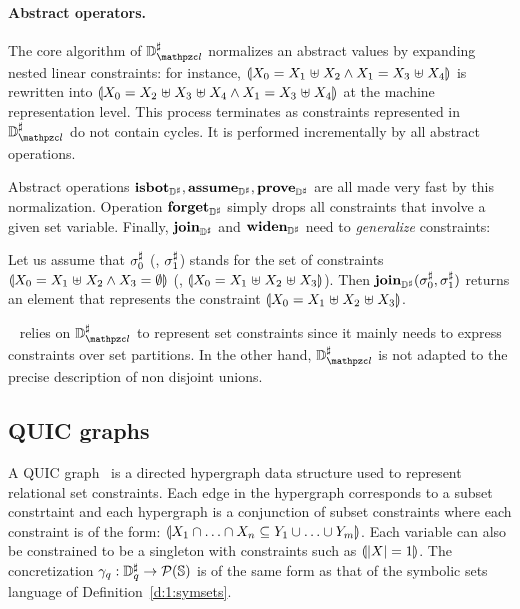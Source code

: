 \paragraph{Abstract operators.}
The core algorithm of \( \adomlin \) normalizes an abstract values by
expanding nested linear constraints:
for instance, \( \llparenthesis X_0 = X_1 \mathrel{\uplus} X_2 \wedge
  X_1 = X_3 \mathrel{\uplus} X_4 \rrparenthesis \) is rewritten into
\( \llparenthesis X_0 = X_2 \mathrel{\uplus} X_3 \mathrel{\uplus} X_4 \wedge
  X_1 = X_3 \mathrel{\uplus} X_4 \rrparenthesis \) at the machine representation
level.
This process terminates as constraints represented in \( \adomlin \)
do not contain cycles.
It is performed incrementally by all abstract operations.

Abstract operations \( \textbf{isbot}_{{\mathbb{D}}^{\sharp}}, \textbf{assume}_{{\mathbb{D}}^{\sharp}}, \textbf{prove}_{{\mathbb{D}}^{\sharp}} \) are all
made very fast by this normalization.
Operation \( \textbf{forget}_{{\mathbb{D}}^{\sharp}} \) simply drops all constraints that involve
a given set variable.
Finally, \( \textbf{join}_{{\mathbb{D}}^{\sharp}} \) and \( \textbf{widen}_{{\mathbb{D}}^{\sharp}} \) need to {\em generalize}
constraints:
\begin{example}
  Let us assume that \( {\sigma}^{\sharp}_0 \) (\resp, \( {\sigma}^{\sharp}_1 \)) stands for
  the set of constraints \( \llparenthesis X_0 = X_1 \mathrel{\uplus} X_2
    \wedge X_3 = \emptyset \rrparenthesis \) (\resp, \( \llparenthesis X_0 = X_1
    \mathrel{\uplus} X_2 \mathrel{\uplus} X_3 \rrparenthesis \)).
  Then \( \textbf{join}_{{\mathbb{D}}^{\sharp}}( {\sigma}^{\sharp}_0, {\sigma}^{\sharp}_1 ) \) returns an element that
  represents the constraint \( \llparenthesis X_0 = X_1 \mathrel{\uplus} X_2
    \mathrel{\uplus} X_3 \rrparenthesis \).
\end{example}
\memcad~\cite{memcad:15:sas} relies on \( \adomlin \) to represent set
constraints since it mainly needs to express constraints over set
partitions.
In the other hand, \( \adomlin \) is not adapted to the precise
description of non disjoint unions.

\subsection{QUIC graphs}
\label{s:4:2:quic}

A QUIC graph~\cite{ab:ecoop:13} is a directed hypergraph data structure used to represent relational set constraints.  Each edge in the hypergraph corresponds to a subset constrtaint and each hypergraph is a conjunction of subset constraints where each constraint is of the form: $\llparenthesis X_1 \cap \ldots \cap X_n \subseteq Y_1 \cup \ldots \cup Y_m \rrparenthesis$.  Each variable can also be constrained to be a singleton with constraints such as $\llparenthesis |X| = 1 \rrparenthesis$.  The concretization $\gamma_q : {\mathbb{D}}^{\sharp}_q \rightarrow \mathcal{P}(\mathbb{S})$ is of the same form as that of the symbolic sets language of Definition~\ref{d:1:symsets}.

